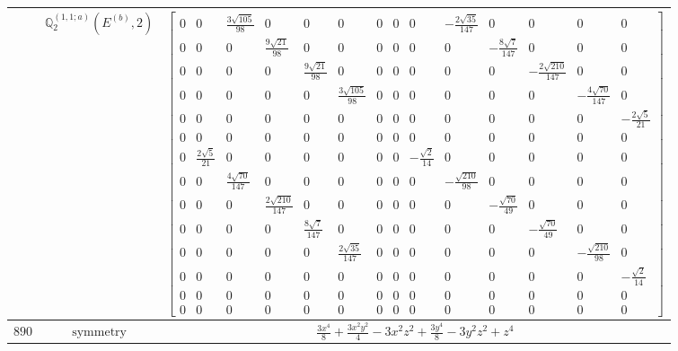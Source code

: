 \documentclass[fleqn,8pt,landscape]{jsarticle}
\begin{document}
\begin{longtable}{ccc}
$  $ & $ \mathbb{Q}_{2}^{(1,1;a)}(E^{(b)},2) $ & $ \begin{bmatrix} 0 & 0 & \frac{3 \sqrt{105}}{98} & 0 & 0 & 0 & 0 & 0 & 0 & - \frac{2 \sqrt{35}}{147} & 0 & 0 & 0 & 0 \\ 0 & 0 & 0 & \frac{9 \sqrt{21}}{98} & 0 & 0 & 0 & 0 & 0 & 0 & - \frac{8 \sqrt{7}}{147} & 0 & 0 & 0 \\ 0 & 0 & 0 & 0 & \frac{9 \sqrt{21}}{98} & 0 & 0 & 0 & 0 & 0 & 0 & - \frac{2 \sqrt{210}}{147} & 0 & 0 \\ 0 & 0 & 0 & 0 & 0 & \frac{3 \sqrt{105}}{98} & 0 & 0 & 0 & 0 & 0 & 0 & - \frac{4 \sqrt{70}}{147} & 0 \\ 0 & 0 & 0 & 0 & 0 & 0 & 0 & 0 & 0 & 0 & 0 & 0 & 0 & - \frac{2 \sqrt{5}}{21} \\ 0 & 0 & 0 & 0 & 0 & 0 & 0 & 0 & 0 & 0 & 0 & 0 & 0 & 0 \\ 0 & \frac{2 \sqrt{5}}{21} & 0 & 0 & 0 & 0 & 0 & 0 & - \frac{\sqrt{2}}{14} & 0 & 0 & 0 & 0 & 0 \\ 0 & 0 & \frac{4 \sqrt{70}}{147} & 0 & 0 & 0 & 0 & 0 & 0 & - \frac{\sqrt{210}}{98} & 0 & 0 & 0 & 0 \\ 0 & 0 & 0 & \frac{2 \sqrt{210}}{147} & 0 & 0 & 0 & 0 & 0 & 0 & - \frac{\sqrt{70}}{49} & 0 & 0 & 0 \\ 0 & 0 & 0 & 0 & \frac{8 \sqrt{7}}{147} & 0 & 0 & 0 & 0 & 0 & 0 & - \frac{\sqrt{70}}{49} & 0 & 0 \\ 0 & 0 & 0 & 0 & 0 & \frac{2 \sqrt{35}}{147} & 0 & 0 & 0 & 0 & 0 & 0 & - \frac{\sqrt{210}}{98} & 0 \\ 0 & 0 & 0 & 0 & 0 & 0 & 0 & 0 & 0 & 0 & 0 & 0 & 0 & - \frac{\sqrt{2}}{14} \\ 0 & 0 & 0 & 0 & 0 & 0 & 0 & 0 & 0 & 0 & 0 & 0 & 0 & 0 \\ 0 & 0 & 0 & 0 & 0 & 0 & 0 & 0 & 0 & 0 & 0 & 0 & 0 & 0 \end{bmatrix} $ \\ \hline
$ 890 $ & $ \text{symmetry} $ & $ \frac{3 x^{4}}{8} + \frac{3 x^{2} y^{2}}{4} - 3 x^{2} z^{2} + \frac{3 y^{4}}{8} - 3 y^{2} z^{2} + z^{4} $ \\

\end{longtable}
\end{document}
